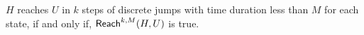%
$H$ reaches $U$ in $k$ steps of discrete jumps with time duration less than $M$ for each state, if and only if, $\mathsf{Reach}^{k,M}(H,U)$ is true.



